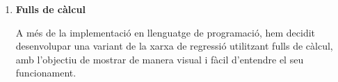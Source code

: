 \begin{enumerate}
\begin{enumerate}
        \item \textbf{Fulls de càlcul}

        A més de la implementació en llenguatge de programació, hem decidit desenvolupar una variant de la xarxa de regressió utilitzant fulls de càlcul, amb l’objectiu de mostrar de manera visual i fàcil d'entendre el seu funcionament.
    \end{enumerate}

\end{enumerate}









%
